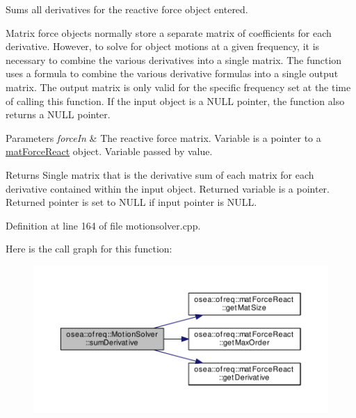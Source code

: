 Sums all derivatives for the reactive force object entered. 

Matrix force objects normally store a separate matrix of coefficients for each derivative. However, to solve for object motions at a given frequency, it is necessary to combine the various derivatives into a single matrix. The function uses a formula to combine the various derivative formulas into a single output matrix. The output matrix is only valid for the specific frequency set at the time of calling this function. If the input object is a N\-U\-L\-L pointer, the function also returns a N\-U\-L\-L pointer. 
\begin{DoxyParams}{Parameters}
{\em force\-In} & The reactive force matrix. Variable is a pointer to a \hyperlink{classosea_1_1ofreq_1_1mat_force_react}{mat\-Force\-React} object. Variable passed by value. \\
\hline
\end{DoxyParams}
\begin{DoxyReturn}{Returns}
Single matrix that is the derivative sum of each matrix for each derivative contained within the input object. Returned variable is a pointer. Returned pointer is set to N\-U\-L\-L if input pointer is N\-U\-L\-L. 
\end{DoxyReturn}


Definition at line 164 of file motionsolver.\-cpp.



Here is the call graph for this function\-:
\nopagebreak
\begin{figure}[H]
\begin{center}
\leavevmode
\includegraphics[width=350pt]{classosea_1_1ofreq_1_1_motion_solver_abe3c2cac5c822e59db5914bf5450d514_cgraph}
\end{center}
\end{figure}


